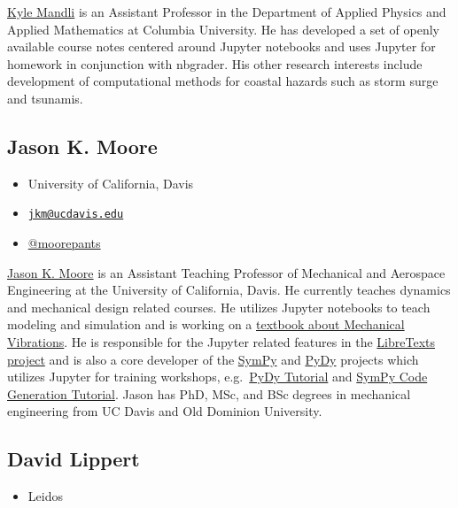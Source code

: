 \documentclass[]{book}
\providecommand{\tightlist}{%
  \setlength{\itemsep}{0pt}\setlength{\parskip}{0pt}}
\begin{document}
\href{http://www.columbia.edu/~ktm2132/}{Kyle Mandli} is an Assistant Professor in the
Department of Applied Physics and Applied Mathematics at Columbia University.
He has developed a set of openly available course notes centered around Jupyter
notebooks and uses Jupyter for homework in conjunction with nbgrader. His other
research interests include development of computational methods for coastal hazards
such as storm surge and tsunamis.

\hypertarget{jason-k.-moore}{%
\subsection*{Jason K. Moore}\label{jason-k.-moore}}

\begin{itemize}
\tightlist
\item
  University of California, Davis
\item
  \href{mailto:jkm@ucdavis.edu}{\nolinkurl{jkm@ucdavis.edu}}
\item
  \href{https://twitter.com/moorepants}{@moorepants}
\end{itemize}

\href{http://moorepants.info/}{Jason K. Moore} is an Assistant Teaching Professor of
Mechanical and Aerospace Engineering at the University of California, Davis. He
currently teaches dynamics and mechanical design related courses. He utilizes
Jupyter notebooks to teach modeling and simulation and is working on a
\href{https://moorepants.github.io/resonance}{textbook about Mechanical Vibrations}.
He is responsible for the Jupyter related features in the \href{http://libretexts.org}{LibreTexts
project} and is also a core developer of the
\href{http://sympy.org/}{SymPy} and \href{http://pydy.org/}{PyDy} projects which utilizes
Jupyter for training workshops, e.g.~\href{https://www.sympy.org/scipy-2017-codegen-tutorial/}{PyDy
Tutorial} and \href{https://github.com/pydy/pydy-tutorial-human-standing}{SymPy Code
Generation Tutorial}.
Jason has PhD, MSc, and BSc degrees in mechanical engineering from UC Davis and
Old Dominion University.

\hypertarget{david-lippert}{%
\subsection*{David Lippert}\label{david-lippert}}

\begin{itemize}
\tightlist
\item
  Leidos
\end{itemize}
\end{document}
